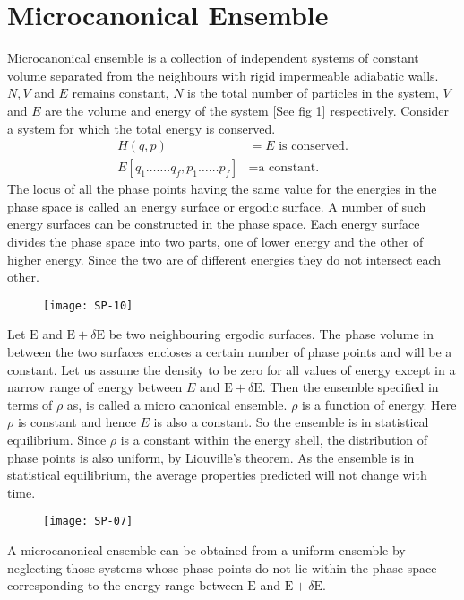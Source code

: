 \section{Microcanonical Ensemble}
Microcanonical ensemble is a collection of independent systems of constant volume separated from the neighbours with rigid impermeable adiabatic walls. $N, V$ and $E$ remains constant, $N$ is the total number of particles in the system, $V$ and $E$ are the volume and energy of the system [See fig \ref{SP-02}] respectively. Consider a system for which the total energy is conserved.
\begin{align*}
H(q, p)&=E \text{ is conserved.}\\
E\left[q_{1} \ldots \ldots . q_{f}, p_{1} \ldots \ldots p_{f}\right]&=\text{a constant.}
\end{align*}
The locus of all the phase points having the same value for the energies in the phase space is called an energy surface or ergodic surface. A number of such energy surfaces can be constructed in the phase space. Each energy surface divides the phase space into two parts, one of lower energy and the other of higher energy. Since the two are of different energies they do not intersect each other.
\begin{figure}[H]
	\centering
	\texttt{[image: SP-10]}
		\caption{}
		\label{SP-02}
\end{figure}
Let $\mathrm{E}$ and $\mathrm{E}+\delta \mathrm{E}$ be two neighbouring ergodic surfaces. The phase volume in between the two surfaces encloses a certain number of phase points and will be a constant. Let us assume the density to be zero for all values of energy except in a narrow range of energy between $E$ and $\mathrm{E}+\delta \mathrm{E}$. Then the ensemble specified in terms of $\rho$ as, is called a micro canonical ensemble.
$\rho$ is a function of energy. Here $\rho$ is constant and hence $E$ is also a constant. So the ensemble is in statistical equilibrium. Since $\rho$ is a constant within the energy shell, the distribution of phase points is also uniform, by Liouville's theorem. As the ensemble is in statistical equilibrium, the average properties predicted will not change with time.\\
\begin{figure}[H]
	\centering
	\texttt{[image: SP-07]}
\end{figure}
A microcanonical ensemble can be obtained from a uniform ensemble by neglecting those systems whose phase points do not lie within the phase space corresponding to the energy range between $\mathrm{E}$ and $\mathrm{E}+\delta \mathrm{E}$.
